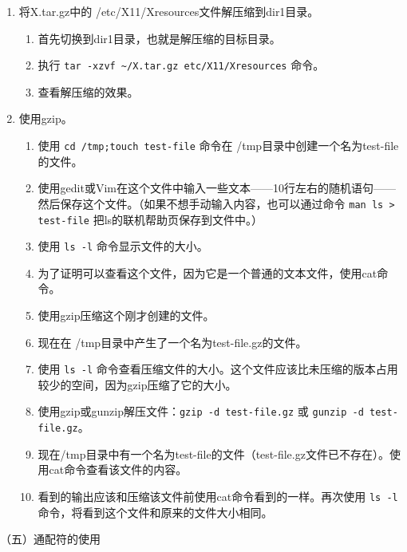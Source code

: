 \begin{enumerate}
\begin{enumerate}
    \end{enumerate}
  \item 将X.tar.gz中的 /etc/X11/Xresources文件解压缩到dir1目录。
    \begin{enumerate}
      \item 首先切换到dir1目录，也就是解压缩的目标目录。
      \item 执行 \verb|tar -xzvf ~/X.tar.gz etc/X11/Xresources| 命令。
      \item 查看解压缩的效果。
    \end{enumerate}
  \item 使用gzip。
    \begin{enumerate}
      \item 使用 \verb|cd /tmp;touch test-file| 命令在 /tmp目录中创建一个名为test-file的文件。
      \item 使用gedit或Vim在这个文件中输入一些文本——10行左右的随机语句——然后保存这个文件。（如果不想手动输入内容，也可以通过命令 \verb|man ls > test-file| 把ls的联机帮助页保存到文件中。）
      \item 使用 \verb|ls -l| 命令显示文件的大小。
      \item 为了证明可以查看这个文件，因为它是一个普通的文本文件，使用cat命令。
      \item 使用gzip压缩这个刚才创建的文件。
      \item 现在在 /tmp目录中产生了一个名为test-file.gz的文件。
      \item 使用 \verb|ls -l| 命令查看压缩文件的大小。这个文件应该比未压缩的版本占用较少的空间，因为gzip压缩了它的大小。
      \item 使用gzip或gunzip解压文件：\verb|gzip -d test-file.gz| 或 \verb|gunzip -d test-file.gz|。
      \item 现在/tmp目录中有一个名为test-file的文件（test-file.gz文件已不存在）。使用cat命令查看该文件的内容。
      \item 看到的输出应该和压缩该文件前使用cat命令看到的一样。再次使用 \verb|ls -l| 命令，将看到这个文件和原来的文件大小相同。
    \end{enumerate}
\end{enumerate}

\vspace{0.1in}
（五）通配符的使用


